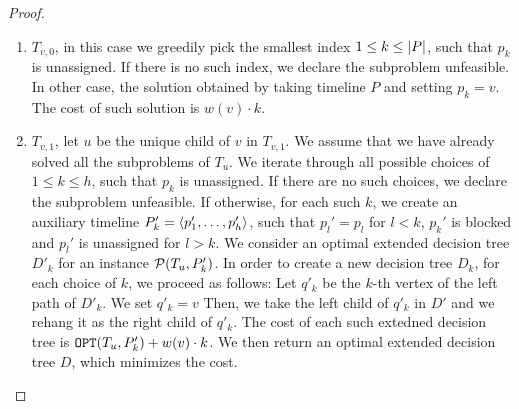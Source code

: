\begin{theorem}
\begin{proof}
    \begin{enumerate}
        \item $T_{v,0}$, in this case we greedily pick the smallest index $1 \leq k \leq \mathopen{}\left| P \right|$, such that $p_k$ is unassigned. If there is no such index, we declare the subproblem unfeasible. In other case, the solution obtained by taking timeline $P$ and setting $p_k=v$. The cost of such solution is $w(v)\cdot k$.
        \item $T_{v,1}$, let $u$ be the unique child of $v$ in $T_{v,1}$. We assume that we have already solved all the subproblems of $T_u$.
        We iterate through all possible choices of $1\leq k \leq h$, such that $p_k$ is unassigned. If there are no such choices, we declare the subproblem unfeasible. If otherwise, for each such $k$, we create an auxiliary timeline $P_k'=
        \mathopen{}\langle p_1',\dots,p_h' \rangle$, such that $p_l'=p_l$ for $l < k$, $p_k'$ is blocked and $p_l'$ is unassigned for $l>k$. We consider an optimal extended decision tree $D'_k$ for an instance $\mathcal{P}\mathopen{}\left( T_{u}, P_k' \right)$. In order to create a new decision tree $D_k$, for each choice of $k$, we proceed as follows: Let $q'_k$ be the $k$-th vertex of the left path of $D'_k$. We set $q'_k=v$ Then, we take the left child of $q'_k$ in $D'$ and we rehang it as the right child of $q'_k$.
        The cost of each such extedned decision tree is $\texttt{OPT}\mathopen{}\left( T_{u}, P_k' \right)+w(v)\cdot k$. We then return an optimal extended decision tree $D$, which minimizes the cost.

\end{enumerate}
\end{proof}
\end{theorem}

